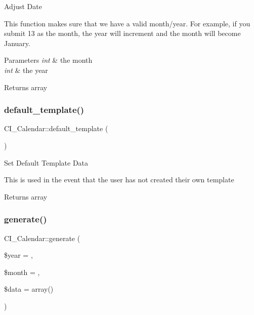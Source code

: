 Adjust Date

This function makes sure that we have a valid month/year. For example, if you submit 13 as the month, the year will increment and the month will become January.


\begin{DoxyParams}{Parameters}
{\em int} & the month \\
\hline
{\em int} & the year \\
\hline
\end{DoxyParams}
\begin{DoxyReturn}{Returns}
array 
\end{DoxyReturn}
\mbox{\label{class_c_i___calendar_acb35a5cb73ab69beb3bcaa3e28dfdb04}} 
\subsubsection{\texorpdfstring{default\+\_\+template()}{default\_template()}}
{\footnotesize\ttfamily C\+I\+\_\+\+Calendar\+::default\+\_\+template (\begin{DoxyParamCaption}{ }\end{DoxyParamCaption})}

Set Default Template Data

This is used in the event that the user has not created their own template

\begin{DoxyReturn}{Returns}
array 
\end{DoxyReturn}
\mbox{\label{class_c_i___calendar_ad2ca24684eb6f022811d268a759422bb}} 
\subsubsection{\texorpdfstring{generate()}{generate()}}
{\footnotesize\ttfamily C\+I\+\_\+\+Calendar\+::generate (\begin{DoxyParamCaption}\item[{}]{\$year = {\ttfamily \textquotesingle{}\textquotesingle{}},  }\item[{}]{\$month = {\ttfamily \textquotesingle{}\textquotesingle{}},  }\item[{}]{\$data = {\ttfamily array()} }\end{DoxyParamCaption})}

